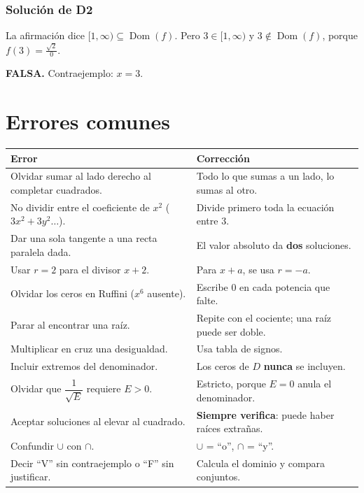 \documentclass[11pt,a4paper]{article}
\theoremstyle{ej}
\newcommand{\dom}{\operatorname{Dom}}
\begin{document}
\subsubsection*{Solución de D2}
La afirmación dice $[1,\infty)\subseteq\dom(f)$. Pero $3\in[1,\infty)$ y $3\notin\dom(f)$, porque $f(3)=\frac{\sqrt2}{0}$.
\begin{respuesta}\textbf{FALSA.} Contraejemplo: $x=3$.\end{respuesta}

\newpage
\section{Errores comunes}

\begin{center}
\begin{tabular}{p{}p{}}
\toprule
\textbf{Error} & \textbf{Corrección}\\ \midrule
Olvidar sumar al lado derecho al completar cuadrados. & Todo lo que sumas a un lado, lo sumas al otro.\\
No dividir entre el coeficiente de $x^2$ ($3x^2+3y^2\dots$). & Divide primero toda la ecuación entre 3.\\
Dar una sola tangente a una recta paralela dada. & El valor absoluto da \textbf{dos} soluciones.\\
Usar $r=2$ para el divisor $x+2$. & Para $x+a$, se usa $r=-a$.\\
Olvidar los ceros en Ruffini ($x^6$ ausente). & Escribe $0$ en cada potencia que falte.\\
Parar al encontrar una raíz. & Repite con el cociente; una raíz puede ser doble.\\
Multiplicar en cruz una desigualdad. & Usa tabla de signos.\\
Incluir extremos del denominador. & Los ceros de $D$ \textbf{nunca} se incluyen.\\
Olvidar que $\dfrac1{\sqrt E}$ requiere $E>0$. & Estricto, porque $E=0$ anula el denominador.\\
Aceptar soluciones al elevar al cuadrado. & \textbf{Siempre verifica}: puede haber raíces extrañas.\\
Confundir $\cup$ con $\cap$. & $\cup$ = ``o'', $\cap$ = ``y''.\\
Decir ``V'' sin contraejemplo o ``F'' sin justificar. & Calcula el dominio y compara conjuntos.\\ \bottomrule
\end{tabular}
\end{center}
\end{document}
